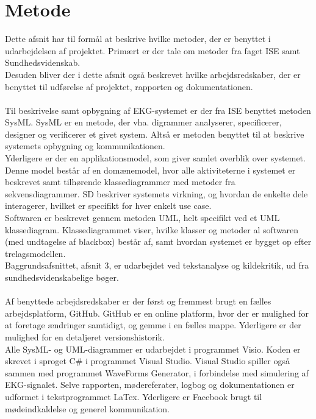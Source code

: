 \section{Metode} 
Dette afsnit har til formål at beskrive hvilke metoder, der er benyttet i udarbejdelsen af projektet. Primært er der tale om metoder fra faget ISE samt Sundhedsvidenskab.\\ 
Desuden bliver der i dette afsnit også beskrevet hvilke arbejdsredskaber, der er benyttet til udførelse af projektet, rapporten og dokumentationen.\\ \\
Til beskrivelse samt opbygning af EKG-systemet er der fra ISE benyttet metoden SysML. SysML er en metode, der vha. digrammer analyserer, specificerer, designer og verificerer et givet system. Altså er metoden benyttet til at beskrive systemets opbygning og kommunikationen. \\ 
Yderligere er der en applikationsmodel, som giver samlet overblik over systemet. Denne model består af en domænemodel, hvor alle aktiviteterne i systemet er beskrevet samt tilhørende klassediagrammer med metoder fra sekvensdiagrammer. SD beskriver systemets virkning, og hvordan de enkelte dele interagerer, hvilket er specifikt for hver enkelt use case.\\ 
Softwaren er beskrevet gennem metoden UML, helt specifikt ved et UML klassediagram. Klassediagrammet viser, hvilke klasser og metoder al softwaren (med undtagelse af blackbox) består af, samt hvordan systemet er bygget op efter trelagsmodellen.\\
Baggrundsafsnittet, afsnit 3, er udarbejdet ved tekstanalyse og kildekritik, ud fra sundhedsvidenskabelige bøger.\\ \\
Af benyttede arbejdsredskaber er der først og fremmest brugt en fælles arbejdsplatform, GitHub. GitHub er en online platform, hvor der er mulighed for at foretage ændringer samtidigt, og gemme i en fælles mappe. Yderligere er der mulighed for en detaljeret versionshistorik.\\
Alle SysML- og UML-diagrammer er udarbejdet i programmet Visio. Koden er skrevet i sproget C\# i programmet Visual Studio. Visual Studio spiller også sammen med programmet WaveForms Generator, i forbindelse med simulering af EKG-signalet. Selve rapporten, mødereferater, logbog og dokumentationen er udformet i tekstprogrammet LaTex. Yderligere er Facebook brugt til mødeindkaldelse og generel kommunikation.



